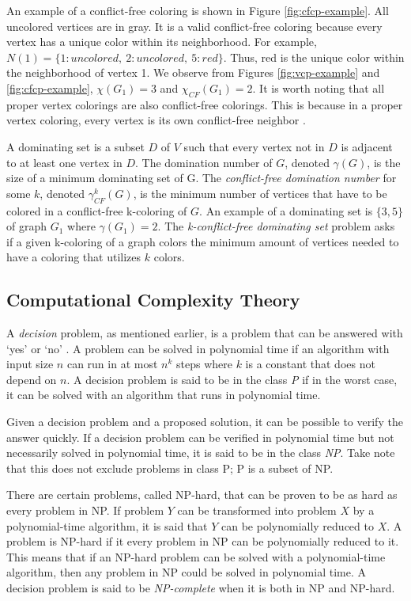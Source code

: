 \documentclass{sig-alternate}
\begin{document}
An example of a conflict-free coloring is shown in Figure \ref{fig:cfcp-example}. All uncolored vertices are in gray. It is a valid conflict-free coloring because every vertex has a unique color within its neighborhood. For example, $N(1) = \{1: uncolored,\ 2: uncolored,\ 5: red\}$. Thus, red is the unique color within the neighborhood of vertex 1. We observe from Figures \ref{fig:vcp-example} and \ref{fig:cfcp-example}, $\chi(G_1) = 3$ and $\chi_{CF}(G_1) = 2$. It is worth noting that all proper vertex colorings are also conflict-free colorings. This is because in a proper vertex coloring, every vertex is its own conflict-free neighbor \cite{abel2017three}.

A dominating set is a subset $D$ of $V$ such that every vertex not in $D$ is adjacent to at least one vertex in $D$. The domination number of $G$, denoted $\gamma(G)$, is the size of a minimum dominating set of G. The \emph{conflict-free domination number} for some $k$, denoted $\gamma_{CF}^k(G)$, is the minimum number of vertices that have to be colored in a conflict-free k-coloring of $G$. An example of a dominating set is $\{3, 5\}$ of graph $G_1$ where $\gamma(G_1) = 2$. The \emph{k-conflict-free dominating set} problem asks if a given k-coloring of a graph colors the minimum amount of vertices needed to have a coloring that utilizes $k$ colors.

\subsection{Computational Complexity Theory}
\label{sec:complexitytheory}
A \emph{decision} problem, as mentioned earlier, is a problem that can be answered with `yes' or `no' \cite{sipser2006introduction}. A problem can be solved in polynomial time if an algorithm with input size $n$ can run in at most $n^k$ steps where $k$ is a constant that does not depend on $n$. A decision problem is said to be in the class \emph{P} if in the worst case, it can be solved with an algorithm that runs in polynomial time.

Given a decision problem and a proposed solution, it can be possible to verify the answer quickly. If a decision problem can be verified in polynomial time but not necessarily solved in polynomial time, it is said to be in the class \emph{NP}. Take note that this does not exclude problems in class P; P is a subset of NP.

There are certain problems, called NP-hard, that can be proven to be as hard as every problem in NP. If problem $Y$ can be transformed into problem $X$ by a polynomial-time algorithm, it is said that $Y$ can be polynomially reduced to $X$. A problem is NP-hard if it every problem in NP can be polynomially reduced to it. This means that if an NP-hard problem can be solved with a polynomial-time algorithm, then any problem in NP could be solved in polynomial time. A decision problem is said to be \emph{NP-complete} when it is both in NP and NP-hard.
\end{document}
